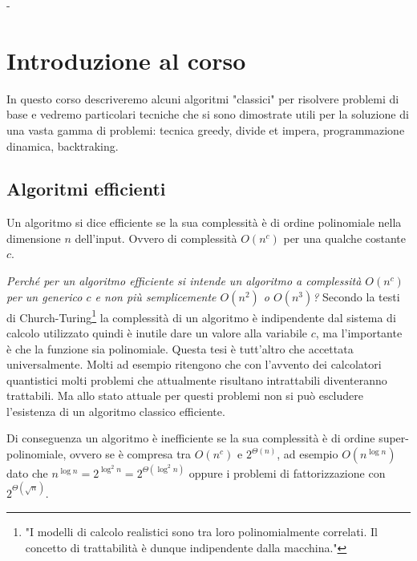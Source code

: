 -\chapter{Introduzione al corso}

In questo corso descriveremo alcuni algoritmi "classici" per risolvere problemi di base e vedremo particolari tecniche che si sono dimostrate utili per la soluzione di una vasta gamma di problemi: tecnica greedy, divide et impera, programmazione dinamica, backtraking.

\section{Algoritmi efficienti}

\begin{redbar}
    Un algoritmo si dice efficiente se la sua complessità è di ordine polinomiale nella dimensione $n$ dell'input. Ovvero di complessità $O(n^c)$ per una qualche costante $c$.
\end{redbar}

\textit{Perché per un algoritmo efficiente si intende un algoritmo a complessità $O(n^c)$ per un generico $c$ e non più semplicemente $O(n^2)$ o $O(n^3)$?}
Secondo la testi di Church-Turing\footnote{"I modelli di calcolo realistici sono tra loro polinomialmente correlati. Il concetto di trattabilità è dunque indipendente dalla macchina."} la complessità di un algoritmo è indipendente dal sistema di calcolo utilizzato quindi è inutile dare un valore alla variabile $c$, ma l'importante è che la funzione sia polinomiale. Questa tesi è tutt'altro che accettata universalmente. Molti ad esempio ritengono che con l'avvento dei calcolatori quantistici molti problemi che attualmente risultano intrattabili diventeranno trattabili. Ma allo stato attuale per questi problemi non si può escludere l'esistenza di un algoritmo classico efficiente.

Di conseguenza un algoritmo è inefficiente se la sua complessità è di ordine super-polinomiale, ovvero se è compresa tra $O(n^c)$ e $2^{\Theta(n)}$, ad esempio $O(n^{\log{n}})$ dato che $n^{\log n}=2^{\log^2 n}=2^{\Theta(\log^2n)}$ oppure i problemi di fattorizzazione con $2^{\Theta(\sqrt{n})}$.

